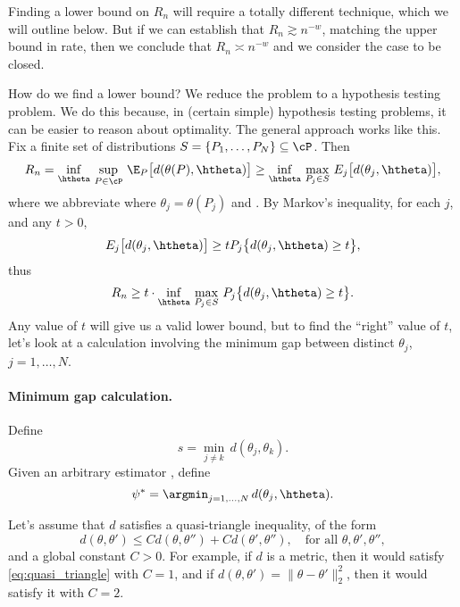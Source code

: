 \documentclass{article}
\begin{document}
Finding a lower bound on $R_n$ will require a totally different technique, which
we will outline below. But if we can establish that $R_n \gtrsim n^{-w}$,
matching the upper bound in rate, then we conclude that $R_n \asymp n^{-w}$ and
we consider the case to be closed.

How do we find a lower bound? We reduce the problem to a hypothesis testing
problem. We do this because, in (certain simple) hypothesis testing problems,
it can be easier to reason about optimality. The general approach works like
this. Fix a finite set of distributions $S = \{P_1,\dots,P_N\} \subseteq
\cP$. Then  
\[
R_n = \inf_{\htheta} \, \sup_{P \in \cP} \, \E_P \big[ d(\theta(P), \htheta)
\big] \geq \inf_{\htheta} \, \max_{P_j \in S} \, E_j \big[ d(\theta_j, \htheta)
\big],  
\]
where we abbreviate where $\theta_j = \theta(P_j)$ and . By Markov's inequality, for each $j$, and any $t>0$, 
\[
E_j \big[ d(\theta_j, \htheta) \big] \geq t P_j \big\{ d(\theta_j, \htheta) 
\geq t \big\}, 
\]
thus
\begin{equation}
\label{eq:finite_lb}
R_n \geq t \cdot \inf_{\htheta} \, \max_{P_j \in S} \, P_j \big\{ d(\theta_j,
\htheta) \geq t \big\}. 
\end{equation}
Any value of $t$ will give us a valid lower bound, but to find the ``right''
value of $t$, let's look at a calculation involving the minimum gap between
distinct $\theta_j$, $j=1,\dots,N$.

\paragraph{Minimum gap calculation.}

Define
\begin{equation}
\label{eq:min_gap}
s = \min_{j \not= k} \, d(\theta_j, \theta_k).
\end{equation}
Given an arbitrary estimator \smash{$\htheta$}, define 
\begin{equation}
\label{eq:psi_star}
\psi^* = \argmin_{j=1,\dots,N} \, d(\theta_j, \htheta).
\end{equation}

Let's assume that $d$ satisfies a quasi-triangle inequality, of the form 
\begin{equation}
\label{eq:quasi_triangle}
d(\theta, \theta') \leq C d(\theta,\theta'') + C d(\theta',\theta''), \quad
\text{for all $\theta,\theta',\theta''$},
\end{equation}
and a global constant $C>0$. For example, if $d$ is a metric, then it would 
satisfy \eqref{eq:quasi_triangle} with $C=1$, and if $d(\theta, \theta') =
\|\theta - \theta'\|_2^2$, then it would satisfy it with $C=2$. 
\end{document}
